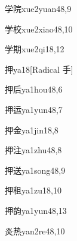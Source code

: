 \begin{verbete}{学院}{xue2yuan4}{8,9}
\end{verbete}

\begin{verbete}{学校}{xue2xiao4}{8,10}
\end{verbete}

\begin{verbete}{学期}{xue2qi1}{8,12}
\end{verbete}

\begin{verbete}{押}{ya1}{8}[Radical 手]
\end{verbete}

\begin{verbete}{押后}{ya1hou4}{8,6}
\end{verbete}

\begin{verbete}{押运}{ya1yun4}{8,7}
\end{verbete}

\begin{verbete}{押金}{ya1jin1}{8,8}
\end{verbete}

\begin{verbete}{押注}{ya1zhu4}{8,8}
\end{verbete}

\begin{verbete}{押送}{ya1song4}{8,9}
\end{verbete}

\begin{verbete}{押租}{ya1zu1}{8,10}
\end{verbete}

\begin{verbete}{押韵}{ya1yun4}{8,13}
\end{verbete}

\begin{verbete}{炎热}{yan2re4}{8,10}
\end{verbete}

